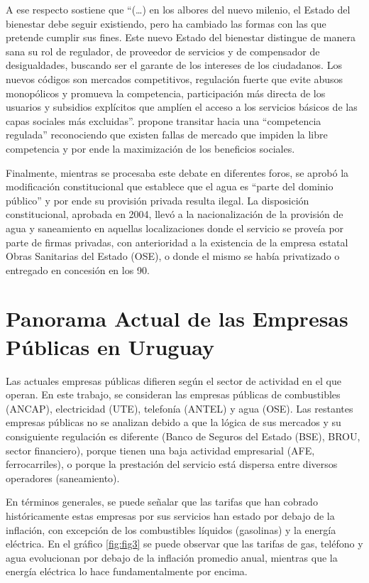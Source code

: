 \documentclass[
  12pt,
  spanish,
]{book}
\begin{document}
A ese respecto \citet{Bergara2001} sostiene que ``(\ldots) en los albores del nuevo milenio, el Estado del bienestar debe seguir existiendo, pero ha cambiado las formas con las que pretende cumplir sus fines. Este nuevo Estado del bienestar distingue de manera sana su rol de regulador, de proveedor de servicios y de compensador de desigualdades, buscando ser el garante de los intereses de los ciudadanos. Los nuevos códigos son mercados competitivos, regulación fuerte que evite abusos monopólicos y promueva la competencia, participación más directa de los usuarios y subsidios explícitos que amplíen el acceso a los servicios básicos de las capas sociales más excluidas''. \citet{Mederos2001} propone transitar hacia una ``competencia regulada'' reconociendo que existen fallas de mercado que impiden la libre competencia y por ende la maximización de los beneficios sociales.

Finalmente, mientras se procesaba este debate en diferentes foros, se aprobó la modificación constitucional que establece que el agua es ``parte del dominio público'' y por ende su provisión privada resulta ilegal. La disposición constitucional, aprobada en 2004, llevó a la nacionalización de la provisión de agua y saneamiento en aquellas localizaciones donde el servicio se proveía por parte de firmas privadas, con anterioridad a la existencia de la empresa estatal Obras Sanitarias del Estado (OSE), o donde el mismo se había privatizado o entregado en concesión en los 90.

\hypertarget{panorama-actual-de-las-empresas-puxfablicas-en-uruguay}{%
\section{Panorama Actual de las Empresas Públicas en Uruguay}\label{panorama-actual-de-las-empresas-puxfablicas-en-uruguay}}

Las actuales empresas públicas difieren según el sector de actividad en el que operan. En este trabajo, se consideran las empresas públicas de combustibles (ANCAP), electricidad (UTE), telefonía (ANTEL) y agua (OSE). Las restantes empresas públicas no se analizan debido a que la lógica de sus mercados y su consiguiente regulación es diferente (Banco de Seguros del Estado (BSE), BROU, sector financiero), porque tienen una baja actividad empresarial (AFE, ferrocarriles), o porque la prestación del servicio está dispersa entre diversos operadores (saneamiento).

En términos generales, se puede señalar que las tarifas que han cobrado históricamente estas empresas por sus servicios han estado por debajo de la inflación, con excepción de los combustibles líquidos (gasolinas) y la energía eléctrica. En el gráfico \ref{fig:fig3} se puede observar que las tarifas de gas, teléfono y agua evolucionan por debajo de la inflación promedio anual, mientras que la energía eléctrica lo hace fundamentalmente por encima.
\end{document}
